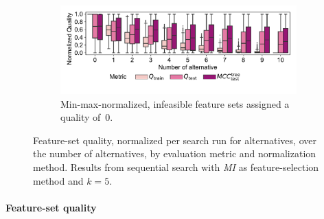 \documentclass{article}
\theoremstyle{definition}
\begin{document}
\begin{figure}[p]
\begin{subfigure}[t]{\textwidth}
		\label{fig:afs:impact-num-alternatives-quality-min-max}
	\end{subfigure}
	\begin{subfigure}[t]{\textwidth}
		\centering
		\includegraphics[width=\textwidth, trim=15 30 15 15, clip]{plots/afs-impact-num-alternatives-quality-min-max-fillna.pdf}
		\caption{Min-max-normalized, infeasible feature sets assigned a quality of~0.}
		\label{fig:afs:impact-num-alternatives-quality-min-max-fillna}
	\end{subfigure}
	\caption{
		Feature-set quality, normalized per search run for alternatives, over the number of alternatives, by evaluation metric and normalization method.
		Results from sequential search with \emph{MI} as feature-selection method and $k=5$.
	}
	\label{fig:afs:impact-num-alternatives-quality}
\end{figure}

\paragraph{Feature-set quality}
\end{document}
